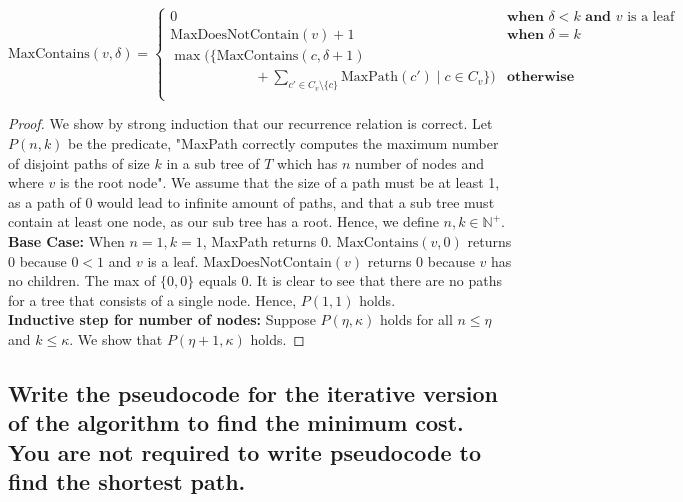 \documentclass[11pt]{scrartcl}
\newcommand{\maxp}{\text{MaxPath}}
\newcommand{\ctn}{\text{MaxContains}}
\newcommand{\dctn}{\text{MaxDoesNotContain}}
\begin{document}
$$
\ctn(v,\delta) = 
\begin{cases} 
	0 & \textbf{when } \delta < k \textbf{ and } v \text{ is a leaf}\\
	\dctn(v) + 1& \textbf{when } \delta = k\\
	\max\bigg(\Big\{
		\ctn(c,\delta + 1) \\  
		\qquad \qquad \qquad
		+ \displaystyle\sum_{c' \in C_v \setminus \{c\}} \maxp(c') \mid c \in C_v
		\Big\}\bigg)& \textbf{otherwise}\\ 
\end{cases}
$$

\begin{proof}
	We show by strong induction that our recurrence relation is correct. Let $P(n,k)$ be the predicate,
	"MaxPath correctly computes the maximum number of disjoint paths of size $k$ in a sub tree
	of $T$ which has $n$ number of nodes and where $v$ is the root node". 
	We assume that the size of a path must be at least 1, as a path of 0 would lead to infinite amount of 
	paths, and that a sub tree must contain at least one node, as our sub tree has a root. 
	Hence, we define $n,k \in \mathbb{N}^+$. \\
	\textbf{Base Case:} When $n = 1, k = 1$, MaxPath returns 0. $\ctn(v,0)$ returns 0 because 
	$0 < 1$ and $v$ is a leaf. $\dctn(v)$ returns 0 because $v$ has no children. The max of $\{0,0\}$ 
	equals $0$. It is clear to see that there are no paths for a tree that consists of a single node.
	Hence, $P(1,1)$ holds.\\
	\textbf{Inductive step for number of nodes:} Suppose $P(\eta,\kappa)$ holds for all $n \leq \eta$ and $k \leq \kappa$. 
	We show that $P(\eta + 1,\kappa)$ holds.



\end{proof}




\subsection{
	Write the pseudocode for the iterative version of the algorithm to find the minimum
	cost. You are not required to write pseudocode to find the shortest path.
}
\end{document}
